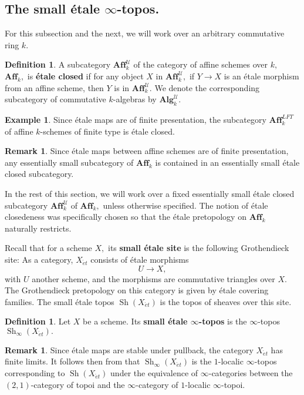 \documentclass[12pt]{amsart}
\theoremstyle{definition}
\newtheorem{definition}[dummy]{Definition}
\newtheorem{example}[dummy]{Example}
\newtheorem{remark}[dummy]{Remark}
\newcommand{\cU}{\mathcal{U}}
\newcommand{\Affk}{\mathbf{Aff}^{\mathit{LFT}}_{k}}
\newcommand{\Affku}{\mathbf{Aff}^{\cU}_{k}}
\newcommand{\Sh}{\operatorname{Sh}}
\newcommand{\et}{\acute{e}t}
\renewcommand{\i}{\infty}
\def\Shi{\Sh_\i}
\def\Algku{\mathbf{Alg}^{\cU}_{k}}
\begin{document}
\subsection{The small \'etale $\i$-topos.}

For this subsection and the next, we will work over an arbitrary commutative ring $k$.

\begin{definition}\label{dfn:etaleclosed}
A subcategory $\Affku$ of the category of affine schemes over $k,$ $\mathbf{Aff}_k,$ is \textbf{\'etale closed} if for any object $X$ in $\Affku,$ if $Y \to X$ is an \'etale morphism from an affine scheme, then $Y$ is in $\Affku$. We denote the corresponding subcategory of commutative $k$-algebras by $\Algku.$
\end{definition}

\begin{example}
Since \'etale maps are of finite presentation, the subcategory $\Affk$ of affine $k$-schemes of finite type is \'etale closed.
\end{example}

\begin{remark}
Since \'etale maps between affine schemes are of finite presentation, any essentially small subcategory of $\mathbf{Aff}_k$ is contained in an essentially small \'etale closed subcategory.
\end{remark}

In the rest of this section, we will work over a fixed essentially small \'etale closed subcategory $\Affku$ of $\mathbf{Aff}_k,$ unless otherwise specified. The notion of \'etale closedeness was specifically chosen so that the \'etale pretopology on $\mathbf{Aff}_k$ naturally restricts.


Recall that for a scheme $X,$ its \textbf{small \'etale site} is the following Grothendieck site: As a category, $X_{\et}$ consists of \'etale morphisms $$U \to X,$$ with $U$ another scheme, and the morphisms are commutative triangles over $X.$ 
The Grothendieck pretopology on this category is given by \'etale covering families.
The small \'etale topos $\Sh\left(X_{\et}\right)$ is the topos of sheaves over this site. 

\begin{definition}
Let $X$ be a scheme. Its \textbf{small \'etale $\i$-topos} is the $\i$-topos $\Shi\left(X_{\et}\right).$
\end{definition}

\begin{remark}
Since \'etale maps are stable under pullback, the category $X_{\et}$ has finite limits. It follows then from \cite[Lemma 6.4.5.6]{htt} that $\Shi\left(X_{\et}\right)$ is the $1$-localic $\i$-topos corresponding to $\Sh\left(X_{\et}\right)$ under the equivalence of $\i$-categories between the $\left(2,1\right)$-category of topoi and the $\i$-category of $1$-localic $\i$-topoi.
\end{remark}
\end{document}
